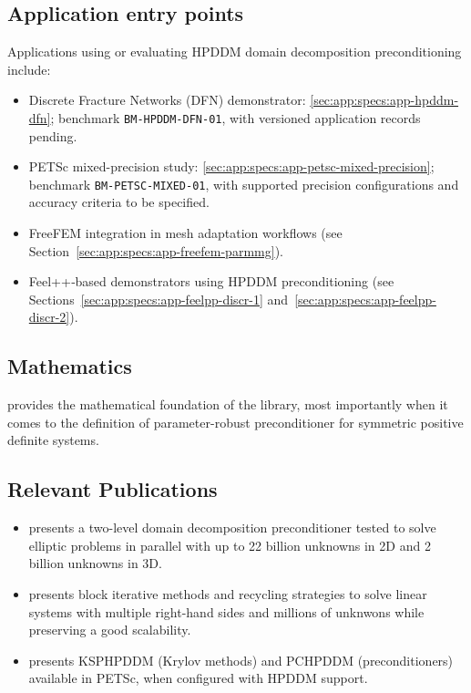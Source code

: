 \subsection{Application entry points}
\label{sec:HPDDM:apps}
Applications using or evaluating HPDDM domain decomposition preconditioning include:
\begin{itemize}
        \item Discrete Fracture Networks (DFN) demonstrator: \cref{sec:app:specs:app-hpddm-dfn}; benchmark \texttt{BM-HPDDM-DFN-01}, with versioned application records pending.
        \item PETSc mixed-precision study: \cref{sec:app:specs:app-petsc-mixed-precision}; benchmark \texttt{BM-PETSC-MIXED-01}, with supported precision configurations and accuracy criteria to be specified.
        \item FreeFEM integration in mesh adaptation workflows (see Section~\ref{sec:app:specs:app-freefem-parmmg}).
        \item Feel++‑based demonstrators using HPDDM preconditioning (see Sections~\ref{sec:app:specs:app-feelpp-discr-1} and~\ref{sec:app:specs:app-feelpp-discr-2}).
\end{itemize}


\subsection{Mathematics}
\label{sec:HPDDM:mathematics}
 provides the mathematical foundation of the library, most importantly when it comes to the definition of parameter-robust preconditioner for symmetric positive definite systems.

\subsection{Relevant Publications}
\label{sec:HPDDM:publications}

\begin{itemize}
\item {} presents a two-level domain decomposition preconditioner tested to solve elliptic problems in parallel with up to 22 billion unknowns in 2D and 2 billion unknowns in 3D.
\item {} presents block iterative methods and recycling strategies to solve linear systems with multiple right-hand sides and millions of unknwons while preserving a good scalability.
\item {} presents KSPHPDDM (Krylov methods) and PCHPDDM (preconditioners) available in PETSc, when configured with HPDDM support.
\end{itemize}
  

